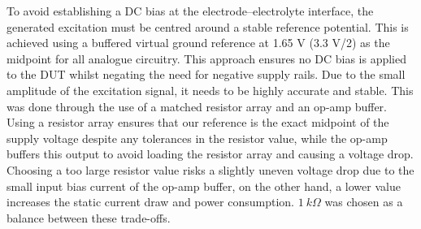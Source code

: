 To avoid establishing a DC bias at the electrode–electrolyte interface, the generated excitation must be centred around a stable reference potential. This is achieved using a buffered virtual ground reference at 1.65 V (3.3 V/2) as the midpoint for all analogue circuitry. This approach ensures no DC bias is applied to the \ac{DUT} whilst negating the need for negative supply rails. Due to the small amplitude of the excitation signal, it needs to be highly accurate and stable. This was done through the use of a matched resistor array and an op-amp buffer. Using a resistor array ensures that our reference is the exact midpoint of the supply voltage despite any tolerances in the resistor value, while the op-amp buffers this output to avoid loading the resistor array and causing a voltage drop. Choosing a too large resistor value risks a slightly uneven voltage drop due to the small input bias current of the op-amp buffer, on the other hand, a lower value increases the static current draw and power consumption. $1~k\Omega$ was chosen as a balance between these trade-offs.

